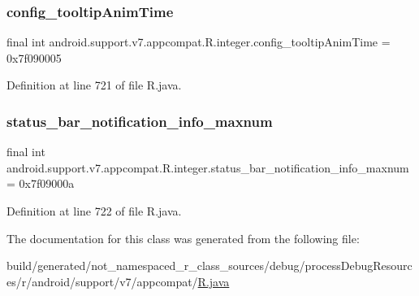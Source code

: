 \subsubsection{\texorpdfstring{config\_tooltipAnimTime}{config\_tooltipAnimTime}}
{\footnotesize\ttfamily final int android.\+support.\+v7.\+appcompat.\+R.\+integer.\+config\+\_\+tooltip\+Anim\+Time = 0x7f090005\hspace{0.3cm}{\ttfamily [static]}}



Definition at line 721 of file R.\+java.

\mbox{\label{classandroid_1_1support_1_1v7_1_1appcompat_1_1_r_1_1integer_a52a3923b3d9ba3b58e218794b30683dc}} 
\subsubsection{\texorpdfstring{status\_bar\_notification\_info\_maxnum}{status\_bar\_notification\_info\_maxnum}}
{\footnotesize\ttfamily final int android.\+support.\+v7.\+appcompat.\+R.\+integer.\+status\+\_\+bar\+\_\+notification\+\_\+info\+\_\+maxnum = 0x7f09000a\hspace{0.3cm}{\ttfamily [static]}}



Definition at line 722 of file R.\+java.



The documentation for this class was generated from the following file\+:\begin{DoxyCompactItemize}
\item 
build/generated/not\+\_\+namespaced\+\_\+r\+\_\+class\+\_\+sources/debug/process\+Debug\+Resources/r/android/support/v7/appcompat/\mbox{\hyperlink{android_2support_2v7_2appcompat_2_r_8java}{R.\+java}}\end{DoxyCompactItemize}
